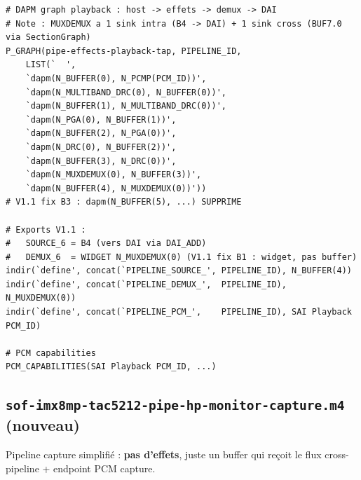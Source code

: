 \documentclass[11pt,a4paper]{article}
\begin{document}
\begin{lstlisting}[language={}, basicstyle=\ttfamily\scriptsize]
# DAPM graph playback : host -> effets -> demux -> DAI
# Note : MUXDEMUX a 1 sink intra (B4 -> DAI) + 1 sink cross (BUF7.0 via SectionGraph)
P_GRAPH(pipe-effects-playback-tap, PIPELINE_ID,
	LIST(`	',
	`dapm(N_BUFFER(0), N_PCMP(PCM_ID))',
	`dapm(N_MULTIBAND_DRC(0), N_BUFFER(0))',
	`dapm(N_BUFFER(1), N_MULTIBAND_DRC(0))',
	`dapm(N_PGA(0), N_BUFFER(1))',
	`dapm(N_BUFFER(2), N_PGA(0))',
	`dapm(N_DRC(0), N_BUFFER(2))',
	`dapm(N_BUFFER(3), N_DRC(0))',
	`dapm(N_MUXDEMUX(0), N_BUFFER(3))',
	`dapm(N_BUFFER(4), N_MUXDEMUX(0))'))
# V1.1 fix B3 : dapm(N_BUFFER(5), ...) SUPPRIME

# Exports V1.1 :
#   SOURCE_6 = B4 (vers DAI via DAI_ADD)
#   DEMUX_6  = WIDGET N_MUXDEMUX(0) (V1.1 fix B1 : widget, pas buffer)
indir(`define', concat(`PIPELINE_SOURCE_', PIPELINE_ID), N_BUFFER(4))
indir(`define', concat(`PIPELINE_DEMUX_',  PIPELINE_ID), N_MUXDEMUX(0))
indir(`define', concat(`PIPELINE_PCM_',    PIPELINE_ID), SAI Playback PCM_ID)

# PCM capabilities
PCM_CAPABILITIES(SAI Playback PCM_ID, ...)
\end{lstlisting}

\subsection{\texttt{sof-imx8mp-tac5212-pipe-hp-monitor-capture.m4} (nouveau)}

Pipeline capture simplifié : \textbf{pas d'effets}, juste un buffer qui reçoit le flux cross-pipeline + endpoint PCM capture.
\end{document}
